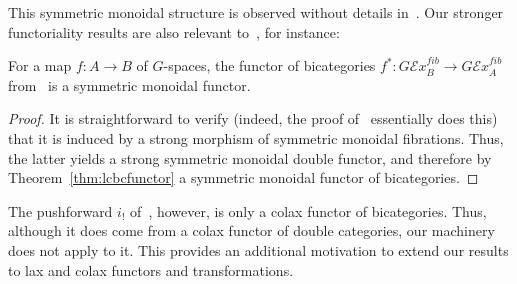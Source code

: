 This symmetric monoidal structure is observed without details in~\cite[Remark 17.17]{maysig:pht}.
Our stronger functoriality results are also relevant to~\cite{maysig:pht}, for instance:

\begin{thm}
  For a map $f:A\to B$ of $G$-spaces, the functor of bicategories $f^*: G\mathcal{E}\mathit{x}^{\mathit{fib}}_B \to G\mathcal{E}\mathit{x}^{\mathit{fib}}_A$ from~\cite[Proposition 19.3.4]{maysig:pht} is a symmetric monoidal functor.
\end{thm}
\begin{proof}
  It is straightforward to verify (indeed, the proof of~\cite[Proposition 19.3.4]{maysig:pht} essentially does this) that it is induced by a strong morphism of symmetric monoidal fibrations.
  Thus, the latter yields a strong symmetric monoidal double functor, and therefore by Theorem~\ref{thm:lcbcfunctor} a symmetric monoidal functor of bicategories.
\end{proof}

The pushforward $i_!$ of~\cite[Proposition 19.3.1]{maysig:pht}, however, is only a colax functor of bicategories.
Thus, although it does come from a colax functor of double categories, our machinery does not apply to it.
This provides an additional motivation to extend our results to lax and colax functors and transformations.


